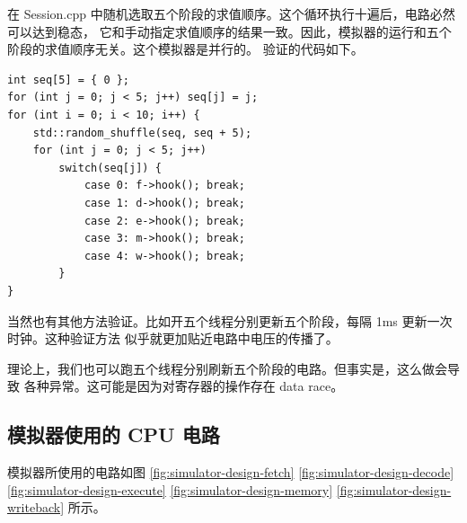 \documentclass[12pt]{article}
\begin{document}
    在 Session.cpp 中随机选取五个阶段的求值顺序。这个循环执行十遍后，电路必然可以达到稳态，
    它和手动指定求值顺序的结果一致。因此，模拟器的运行和五个阶段的求值顺序无关。这个模拟器是并行的。
    验证的代码如下。

    \begin{verbatim}
int seq[5] = { 0 };
for (int j = 0; j < 5; j++) seq[j] = j;
for (int i = 0; i < 10; i++) {
    std::random_shuffle(seq, seq + 5);
    for (int j = 0; j < 5; j++)
        switch(seq[j]) {
            case 0: f->hook(); break;
            case 1: d->hook(); break;
            case 2: e->hook(); break;
            case 3: m->hook(); break;
            case 4: w->hook(); break;
        }
}
    \end{verbatim}

    当然也有其他方法验证。比如开五个线程分别更新五个阶段，每隔 1ms 更新一次时钟。这种验证方法
    似乎就更加贴近电路中电压的传播了。

    \begin{tcolorbox}
        理论上，我们也可以跑五个线程分别刷新五个阶段的电路。但事实是，这么做会导致
        各种异常。这可能是因为对寄存器的操作存在 data race。
    \end{tcolorbox}

    \subsection{模拟器使用的 CPU 电路}

    模拟器所使用的电路如图 \ref{fig:simulator-design-fetch} 
    \ref{fig:simulator-design-decode} 
    \ref{fig:simulator-design-execute} 
    \ref{fig:simulator-design-memory} 
    \ref{fig:simulator-design-writeback} 所示。
\end{document}
